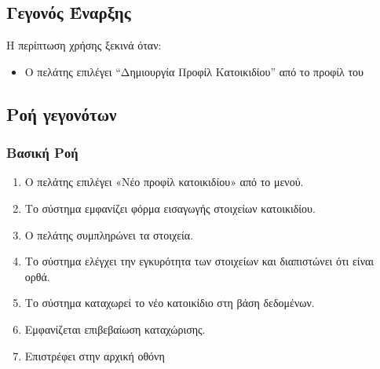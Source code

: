 \documentclass[12pt,a4paper,twoside]{book}
\begin{document}
\subsection{Γεγονός Έναρξης}
Η περίπτωση χρήσης ξεκινά όταν:
\begin{itemize}
  \item Ο πελάτης επιλέγει “Δημιουργία Προφίλ Κατοικιδίου” από το προφίλ του   %
\end{itemize}

\subsection{Ροή γεγονότων}

\subsubsection{Βασική Ροή}
\begin{enumerate}
  \item Ο πελάτης επιλέγει «Νέο προφίλ κατοικιδίου» από το μενού.  %
  \item Το σύστημα εμφανίζει φόρμα εισαγωγής στοιχείων κατοικιδίου.  %
  \item Ο πελάτης συμπληρώνει τα στοιχεία.   %
  \item Το σύστημα ελέγχει την εγκυρότητα των στοιχείων και διαπιστώνει ότι είναι ορθά.  %
  \item Το σύστημα καταχωρεί το νέο κατοικίδιο στη βάση δεδομένων.  %
  \item Εμφανίζεται επιβεβαίωση καταχώρισης.  %
  \item Επιστρέφει στην αρχική οθόνη    %
\end{enumerate}
\end{document}

